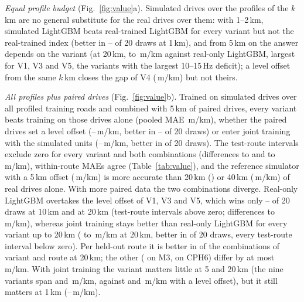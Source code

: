 

\emph{Equal profile budget} (Fig.~\ref{fig:value}a).
Simulated drives over the profiles of the $k$\,km are no general substitute for the real drives over them: with 1--2\,km, simulated LightGBM beats real-trained LightGBM for every variant but not the real-trained index (better in \pcSameWinsIdxOneMin--\pcSameWinsIdxOneMax{} of 20 draws at 1\,km), and from 5\,km on the answer depends on the variant (at 20\,km, \pcSameDiffTwentyMin{} to \pcSameDiffTwentyMax\,m/km against real-only LightGBM, largest for V1, V3 and V5, the variants with the largest 10--15\,Hz deficit); a level offset from the same $k$\,km closes the gap of V4 (\pcSameCalVfourDiffTwenty\,m/km) but not theirs.

\emph{All profiles plus paired drives} (Fig.~\ref{fig:value}b).
Trained on simulated drives over all profiled training roads and combined with 5\,km of paired drives, every variant beats training on those drives alone (pooled MAE \vbRealOnlyFive\,m/km), whether the paired drives set a level offset (\pcCalMaeFiveMin--\pcCalMaeFiveMax\,m/km, better in \pcCalWinsFiveMin--\pcCalWinsFiveMax{} of 20 draws) or enter joint training with the simulated units (\poMaeFiveMin--\poMaeFiveMax\,m/km, better in \poWinsFiveRange{} of 20 draws).
The test-route intervals exclude zero for every variant and both combinations (differences \cuCalFiveDiffMin{} to \cuCalFiveDiffMax{} and \cuPoolFiveDiffMin{} to \cuPoolFiveDiffMax\,m/km), within-route MAEs agree (Table~\ref{tab:value}), and the reference simulator with a 5\,km offset (\vvVzeroCalFive\,m/km) is more accurate than 20\,km (\vbRealOnlyTwenty) or 40\,km (\vbRealOnlyForty\,m/km) of real drives alone.
With more paired data the two combinations diverge.
Real-only LightGBM overtakes the level offset of V1, V3 and V5, which wins only \pcCalHiDefWinsTenMin--\pcCalHiDefWinsTenMax{} of 20 draws at 10\,km and \pcCalHiDefWinsTwentyMax{} at 20\,km (test-route intervals above zero; differences \cuCalVoneTwenty{} to \cuCalVfiveTwenty\,m/km), whereas joint training stays better than real-only LightGBM for every variant up to 20\,km (\poDiffTwentyMin{} to \poDiffTwentyMax\,m/km at 20\,km, better in \poWinsTwentyRange{} of 20 draws, every test-route interval below zero).
Per held-out route it is better in \poRouteTwentyNeg{} of the \poRouteTwentyCells{} combinations of variant and route at 20\,km; the other \poRouteTwentyPos{} (\poRouteTwentyMwThreePos{} on M3, \poRouteTwentyCphSixPos{} on CPH6) differ by at most \poRouteTwentyDiffMax\,m/km.
With joint training the variant matters little at 5 and 20\,km (the nine variants span \poMaeSpreadFive{} and \poMaeSpreadTwenty\,m/km, against \poCalSpreadFive{} and \poCalSpreadTwenty\,m/km with a level offset), but it still matters at 1\,km (\poMaeOneMin--\poMaeOneMax\,m/km).


